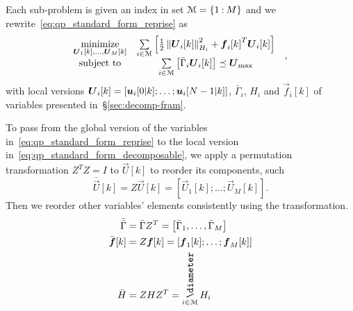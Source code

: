 \documentclass[../main.tex]{subfiles}
\begin{document}
Each sub-problem is given an index in set $\mathcal{M}=\{1\mathbin{:}M\}$ and we rewrite~\eqref{eq:qp_standard_form_reprise} as
\begin{equation}
  \label{eq:qp_standard_form_decomposable}
  \begin{aligned}
    \begin{matrix}
      \underset{\boldsymbol{U}_{1}[k],\dots, \boldsymbol{U}_{M}[k]}{\mathrm{minimize}} &
      \sum\limits_{i\in\mathcal{M}}\left[\frac{1}{2}\left\lVert\boldsymbol{U}_{i}[k]\right\rVert^{2}_{H_{i}} + {\boldsymbol{f}_{i}[k]}^{T}\boldsymbol{U}_{i}[k]\right]&\\
      \mathrm{subject~ to} & \sum\limits_{i\in\mathcal{M}}\left[\bar{\Gamma}_{i}\boldsymbol{U}_{i}[k]\right] \preceq {\boldsymbol{U}}_{\text{max}}
    \end{matrix}
  \end{aligned},
\end{equation}
with local versions $\boldsymbol{U}_{i}[k]=\left[\boldsymbol{u}_{i}[0|k]; \dots; \boldsymbol{u}_{i}[N-1|k]\right]$, $\bar{\Gamma}_{i}$, $H_{i}$ and $\vec{f}_{i}[k]$ of variables presented in~\S\ref{sec:decomp-fram}.

\begin{remark}
  To pass from the global version of the variables in~\eqref{eq:qp_standard_form_reprise} to the local version in~\ref{eq:qp_standard_form_decomposable}, we apply a permutation transformation $Z^{T}Z=I$ to $\vec{U}[k]$ to reorder its components, such
  \begin{equation}
    \bar{\vec{U}}[k]=Z\vec{U}[k]=\left[\vec{U}_{1}[k]; \dots; \vec{U}_{M}[k]\right].
  \end{equation}
  Then we reorder other variables' elements consistently using the transformation.
  \begin{align}
    \label{eq:1}
    \bar{\bar{\Gamma}}&=\bar{\Gamma}Z^{T}=\left[\bar{\Gamma}_{1}, \dots, \bar{\Gamma}_{M}\right]\\
    \bar{\vec{f}}[k]&=Z\vec{f}[k]=\left[\vec{f}_{1}[k]; \dots; \vec{f}_{M}[k]\right]\\
    \bar{H}&=ZHZ^{T}=\blkdiag\limits_{i\in\set{M}} H_{i}
  \end{align}
\end{remark}
\end{document}
